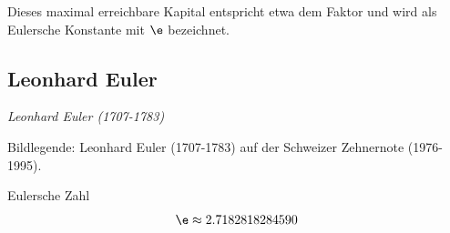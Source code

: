 Dieses maximal erreichbare Kapital entspricht etwa dem Faktor  und
wird als Eulersche Konstante mit $\e$ bezeichnet.
\newpage
\subsection*{Leonhard Euler}


\begin{center}\textit{Leonhard Euler (1707-1783)}\end{center}


Bildlegende: Leonhard Euler (1707-1783) auf der Schweizer Zehnernote (1976-1995).

\begin{definition}{Eulersche Zahl}{}
$$\e \approx 2.7182818284590$$
\end{definition}
\newpage
